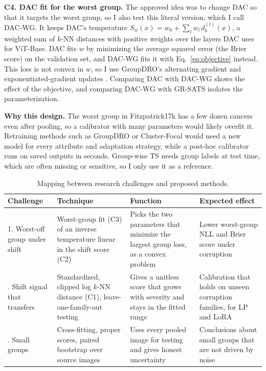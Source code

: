 \documentclass[sigconf,nonacm]{acmart}
\begin{document}
\textbf{C4. DAC fit for the worst group.} The approved idea was to change DAC so that it targets the worst group, so I also test this literal version, which I call DAC-WG. It keeps DAC's temperature $S_w(x) = w_0 + \sum_l w_l\, d_k^{(l)}(x)$, a weighted sum of $k$-NN distances with positive weights over the layers DAC uses for ViT-Base. DAC fits $w$ by minimizing the average squared error (the Brier score) on the validation set, and DAC-WG fits it with Eq.~\eqref{eq:objective} instead. This loss is not convex in $w$, so I use GroupDRO's alternating gradient and exponentiated-gradient updates \cite{sagawa2020groupdro}. Comparing DAC with DAC-WG shows the effect of the objective, and comparing DAC-WG with GR-SATS isolates the parameterization.

\textbf{Why this design.} The worst group in Fitzpatrick17k has a few dozen cancers even after pooling, so a calibrator with many parameters would likely overfit it. Retraining methods such as GroupDRO or Cluster-Focal would need a new model for every attribute and adaptation strategy, while a post-hoc calibrator runs on saved outputs in seconds. Group-wise TS needs group labels at test time, which are often missing or sensitive, so I only use it as a reference.

\begin{table}[t]
  \caption{Mapping between research challenges and proposed methods.}
  \label{tab:mapping}
  \scriptsize
  \setlength{\tabcolsep}{3pt}
  \renewcommand{\arraystretch}{1.1}
  \begin{tabularx}{\columnwidth}{@{}P{1.3cm}LLL@{}}
    \toprule
    \textbf{Challenge} & \textbf{Technique} & \textbf{Function} & \textbf{Expected effect} \\
    . Worst-off group under shift & Worst-group fit (C3) of an inverse temperature linear in the shift score (C2) & Picks the two parameters that minimize the largest group loss, as a convex problem & Lower worst-group NLL and Brier score under corruption \\
    . Shift signal that transfers & Standardized, clipped log $k$-NN distance (C1), leave-one-family-out testing & Gives a unitless score that grows with severity and stays in the fitted range & Calibration that holds on unseen corruption families, for LP and LoRA \\
    . Small groups & Cross-fitting, proper scores, paired bootstrap over source images & Uses every pooled image for testing and gives honest uncertainty & Conclusions about small groups that are not driven by noise \\
    \bottomrule
  \end{tabularx}
\end{table}
\end{document}
